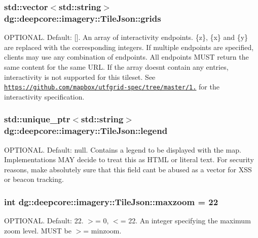 \subsubsection[{\texorpdfstring{grids}{grids}}]{\setlength{\rightskip}{0pt plus 5cm}std\+::vector$<$std\+::string$>$ dg\+::deepcore\+::imagery\+::\+Tile\+Json\+::grids}\hypertarget{structdg_1_1deepcore_1_1imagery_1_1_tile_json_a0155f9490e2a1db7894307c860bb5f93}{}\label{structdg_1_1deepcore_1_1imagery_1_1_tile_json_a0155f9490e2a1db7894307c860bb5f93}
O\+P\+T\+I\+O\+N\+AL. Default\+: \mbox{[}\mbox{]}. An array of interactivity endpoints. \{z\}, \{x\} and \{y\} are replaced with the corresponding integers. If multiple endpoints are specified, clients may use any combination of endpoints. All endpoints M\+U\+ST return the same content for the same U\+RL. If the array doesn\textquotesingle{}t contain any entries, interactivity is not supported for this tileset. See \href{https://github.com/mapbox/utfgrid-spec/tree/master/1.2}{\tt https\+://github.\+com/mapbox/utfgrid-\/spec/tree/master/1.} for the interactivity specification. 
\subsubsection[{\texorpdfstring{legend}{legend}}]{\setlength{\rightskip}{0pt plus 5cm}std\+::unique\+\_\+ptr$<$std\+::string$>$ dg\+::deepcore\+::imagery\+::\+Tile\+Json\+::legend}\hypertarget{structdg_1_1deepcore_1_1imagery_1_1_tile_json_a6c3f9e95dcca896f30244d71b4a93be1}{}\label{structdg_1_1deepcore_1_1imagery_1_1_tile_json_a6c3f9e95dcca896f30244d71b4a93be1}
O\+P\+T\+I\+O\+N\+AL. Default\+: null. Contains a legend to be displayed with the map. Implementations M\+AY decide to treat this as H\+T\+ML or literal text. For security reasons, make absolutely sure that this field can\textquotesingle{}t be abused as a vector for X\+SS or beacon tracking. 
\subsubsection[{\texorpdfstring{maxzoom}{maxzoom}}]{\setlength{\rightskip}{0pt plus 5cm}int dg\+::deepcore\+::imagery\+::\+Tile\+Json\+::maxzoom = 22}\hypertarget{structdg_1_1deepcore_1_1imagery_1_1_tile_json_a8f32c4c1ca4750f301ed39ce8d3c19f5}{}\label{structdg_1_1deepcore_1_1imagery_1_1_tile_json_a8f32c4c1ca4750f301ed39ce8d3c19f5}
O\+P\+T\+I\+O\+N\+AL. Default\+: 22. $>$= 0, $<$= 22. An integer specifying the maximum zoom level. M\+U\+ST be $>$= minzoom. 
